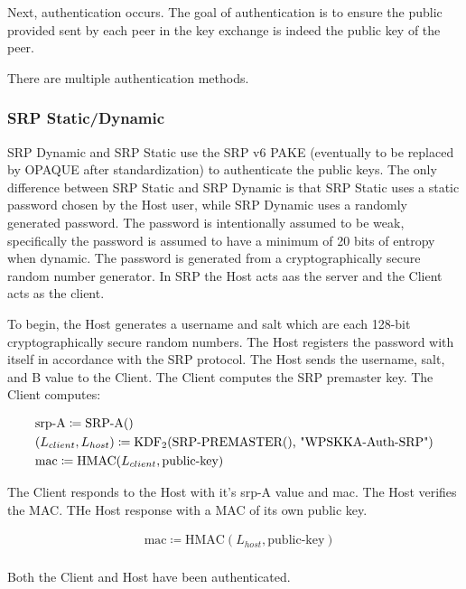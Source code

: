 \documentclass{article}
\begin{document}
    Next, authentication occurs.
    The goal of authentication is to ensure the public provided sent by each peer in the key exchange is indeed the
    public key of the peer.

    There are multiple authentication methods.

    \subsubsection{SRP Static/Dynamic}

    SRP Dynamic and SRP Static use the SRP v6 PAKE (eventually to be replaced by OPAQUE after standardization)
    to authenticate the public keys.
    The only difference between SRP Static and SRP Dynamic is that SRP Static uses a static password chosen by the
    Host user, while SRP Dynamic uses a randomly generated password.
    The password is intentionally assumed to be weak, specifically the password is assumed to have a minimum of 20
    bits of entropy when dynamic.
    The password is generated from a cryptographically secure random number generator.
    In SRP the Host acts aas the server and the Client acts as the client.

    To begin, the Host generates a username and salt which are each 128-bit cryptographically secure random numbers.
    The Host registers the password with itself in accordance with the SRP protocol.
    The Host sends the username, salt, and B value to the Client.
    The Client computes the SRP premaster key.
    The Client computes:

    \begin{align*}
        & \text{srp-A} \coloneqq \text{SRP-A()}\\
        & (L_{client}, L_{host}) \coloneqq \text{KDF}_2\text{(SRP-PREMASTER(), \text{"WPSKKA-Auth-SRP"})}\\
        & \text{mac} \coloneqq \text{HMAC}(L_{client},\text{public-key})\\
    \end{align*}

    The Client responds to the Host with it's srp-A value and mac.
    The Host verifies the MAC.
    THe Host response with a MAC of its own public key.

    \begin{align*}
        & \text{mac} \coloneqq \text{HMAC}(L_{host}, \text{public-key})\\
    \end{align*}

    Both the Client and Host have been authenticated.
\end{document}
